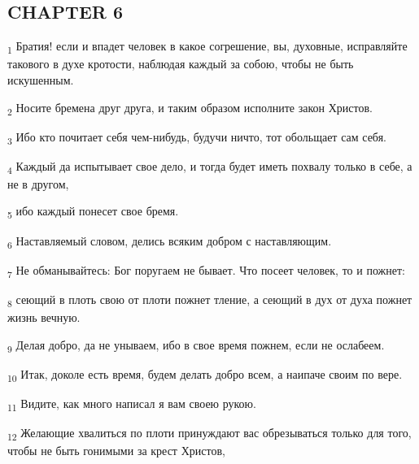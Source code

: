 \subsection{CHAPTER 6}
\begin{tcolorbox}
\textsubscript{1} Братия! если и впадет человек в какое согрешение, вы, духовные, исправляйте такового в духе кротости, наблюдая каждый за собою, чтобы не быть искушенным.
\end{tcolorbox}
\begin{tcolorbox}
\textsubscript{2} Носите бремена друг друга, и таким образом исполните закон Христов.
\end{tcolorbox}
\begin{tcolorbox}
\textsubscript{3} Ибо кто почитает себя чем-нибудь, будучи ничто, тот обольщает сам себя.
\end{tcolorbox}
\begin{tcolorbox}
\textsubscript{4} Каждый да испытывает свое дело, и тогда будет иметь похвалу только в себе, а не в другом,
\end{tcolorbox}
\begin{tcolorbox}
\textsubscript{5} ибо каждый понесет свое бремя.
\end{tcolorbox}
\begin{tcolorbox}
\textsubscript{6} Наставляемый словом, делись всяким добром с наставляющим.
\end{tcolorbox}
\begin{tcolorbox}
\textsubscript{7} Не обманывайтесь: Бог поругаем не бывает. Что посеет человек, то и пожнет:
\end{tcolorbox}
\begin{tcolorbox}
\textsubscript{8} сеющий в плоть свою от плоти пожнет тление, а сеющий в дух от духа пожнет жизнь вечную.
\end{tcolorbox}
\begin{tcolorbox}
\textsubscript{9} Делая добро, да не унываем, ибо в свое время пожнем, если не ослабеем.
\end{tcolorbox}
\begin{tcolorbox}
\textsubscript{10} Итак, доколе есть время, будем делать добро всем, а наипаче своим по вере.
\end{tcolorbox}
\begin{tcolorbox}
\textsubscript{11} Видите, как много написал я вам своею рукою.
\end{tcolorbox}
\begin{tcolorbox}
\textsubscript{12} Желающие хвалиться по плоти принуждают вас обрезываться только для того, чтобы не быть гонимыми за крест Христов,
\end{tcolorbox}
